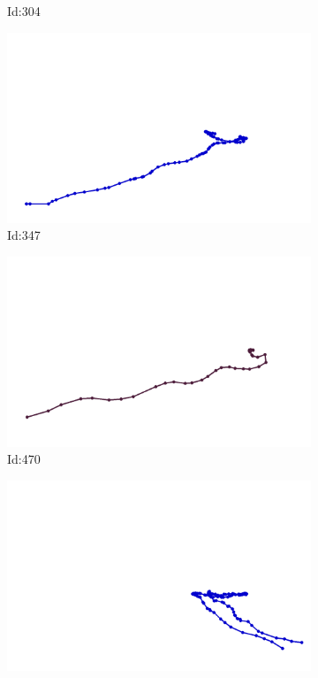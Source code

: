 \documentclass[12pt,twoside]{report}
\begin{document}
\begin{figure}
\begin{subfigure}[b]{0.20\textwidth}
\caption{Id:304}
\end{subfigure}
\begin{subfigure}[b]{0.20\textwidth}
\centering
\includegraphics[width=\textwidth]{../trajectories/347.png}
\caption{Id:347}
\end{subfigure}
\begin{subfigure}[b]{0.20\textwidth}
\centering
\includegraphics[width=\textwidth]{../trajectories/470.png}
\caption{Id:470}
\end{subfigure}
\begin{subfigure}[b]{0.20\textwidth}
\centering
\includegraphics[width=\textwidth]{../trajectories/609.png}

\end{subfigure}
\end{figure}
\end{document}
